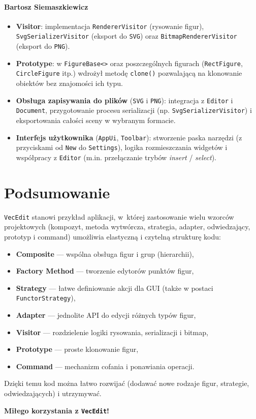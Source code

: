 \documentclass[a4paper,12pt]{article}
\begin{document}
\paragraph{Bartosz Siemaszkiewicz}
\begin{itemize}
    \item \textbf{Visitor}: implementacja \texttt{RendererVisitor} (rysowanie figur), \texttt{SvgSerializerVisitor} (eksport do \texttt{SVG}) oraz \texttt{BitmapRendererVisitor} (eksport do \texttt{PNG}).
    \item \textbf{Prototype}: w \texttt{FigureBase<>} oraz poszczególnych figurach (\texttt{RectFigure}, \texttt{CircleFigure} itp.) wdrożył metodę \texttt{clone()} pozwalającą na klonowanie obiektów bez znajomości ich typu.
    \item \textbf{Obsługa zapisywania do plików} (\texttt{SVG} i \texttt{PNG}): integracja z \texttt{Editor} i \texttt{Document}, przygotowanie procesu serializacji (np. \texttt{SvgSerializerVisitor}) i eksportowania całości sceny w wybranym formacie.
    \item \textbf{Interfejs użytkownika} (\texttt{AppUi}, \texttt{Toolbar}): stworzenie paska narzędzi (z przyciskami od \texttt{New} do \texttt{Settings}), logika rozmieszczania widgetów i współpracy z \texttt{Editor} (m.in. przełączanie trybów \emph{insert} / \emph{select}).
\end{itemize}

\section{Podsumowanie}
\texttt{VecEdit} stanowi przykład aplikacji, w~której zastosowanie wielu wzorców
projektowych (kompozyt, metoda wytwórcza, strategia, adapter, odwiedzający,
prototyp i command) umożliwia elastyczną i czytelną strukturę kodu:
\begin{itemize}
    \item \textbf{Composite} — wspólna obsługa figur i grup (hierarchii),
    \item \textbf{Factory Method} — tworzenie edytorów punktów figur,
    \item \textbf{Strategy} — łatwe definiowanie akcji dla GUI (także w postaci \texttt{FunctorStrategy}),
    \item \textbf{Adapter} — jednolite API do edycji różnych typów figur,
    \item \textbf{Visitor} — rozdzielenie logiki rysowania, serializacji i bitmap,
    \item \textbf{Prototype} — proste klonowanie figur,
    \item \textbf{Command} — mechanizm cofania i ponawiania operacji.
\end{itemize}

Dzięki temu kod można łatwo rozwijać (dodawać nowe rodzaje figur, strategie, odwiedzających) 
i utrzymywać.

\vspace{1em}
\noindent
\textbf{Miłego korzystania z \texttt{VecEdit}!}
\end{document}
